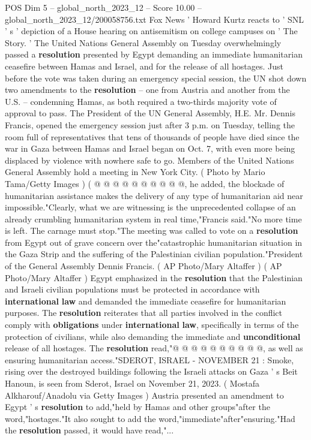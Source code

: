 \begin{textsample}{POS Dim 5 – global\_north\_2023\_12 – Score 10.00 – global\_north\_2023\_12/200058756.txt}  \label{ex:f5_pos_348}
Fox News ' Howard Kurtz reacts to ' SNL ' s ' depiction of a House hearing on antisemitism on college campuses on ' The Story. ' The United Nations General Assembly on Tuesday overwhelmingly passed a \textbf{resolution} presented by Egypt demanding an immediate humanitarian ceasefire between Hamas and Israel, and for the release of all hostages.
Just before the vote was taken during an emergency special session, the UN shot down two amendments to the \textbf{resolution} -- one from Austria and another from the U.S. -- condemning Hamas, as both required a two-thirds majority vote of approval to pass.
The President of the UN General Assembly, H.E.
Mr.
Dennis Francis, opened the emergency session just after 3 p.m. on Tuesday, telling the room full of representatives that tens of thousands of people have died since the war in Gaza between Hamas and Israel began on Oct. 7, with even more being displaced by violence with nowhere safe to go.
Members of the United Nations General Assembly hold a meeting in New York City. ( Photo by Mario Tama/Getty Images ) ( @ @ @ @ @ @ @ @ @ @, he added, the blockade of humanitarian assistance makes the delivery of any type of humanitarian aid near impossible."Clearly, what we are witnessing is the unprecedented collapse of an already crumbling humanitarian system in real time,"Francis said."No more time is left.
The carnage must stop."The meeting was called to vote on a \textbf{resolution} from Egypt out of grave concern over the"catastrophic humanitarian situation in the Gaza Strip and the suffering of the Palestinian civilian population."President of the General Assembly Dennis Francis. ( AP Photo/Mary Altaffer ) ( AP Photo/Mary Altaffer ) Egypt emphasized in the \textbf{resolution} that the Palestinian and Israeli civilian populations must be protected in accordance with \textbf{international} \textbf{law} and demanded the immediate ceasefire for humanitarian purposes.
The \textbf{resolution} reiterates that all parties involved in the conflict comply with \textbf{obligations} under \textbf{international} \textbf{law}, specifically in terms of the protection of civilians, while also demanding the immediate and \textbf{unconditional} release of all hostages.
The \textbf{resolution} read,"@ @ @ @ @ @ @ @ @ @, as well as ensuring humanitarian access."SDEROT, ISRAEL - NOVEMBER 21 : Smoke, rising over the destroyed buildings following the Israeli attacks on Gaza ' s Beit Hanoun, is seen from Sderot, Israel on November 21, 2023. ( Mostafa Alkharouf/Anadolu via Getty Images ) Austria presented an amendment to Egypt ' s \textbf{resolution} to add,"held by Hamas and other groups"after the word,"hostages."It also sought to add the word,"immediate"after"ensuring."Had the \textbf{resolution} passed, it would have read,"...

\end{textsample}
